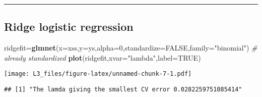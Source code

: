 \documentclass[
]{article}
\newenvironment{Shaded}{\begin{snugshade}}{\end{snugshade}}
\newcommand{\CommentTok}[1]{\textcolor[rgb]{0.56,0.35,0.01}{\textit{#1}}}
\newcommand{\DataTypeTok}[1]{\textcolor[rgb]{0.13,0.29,0.53}{#1}}
\newcommand{\DecValTok}[1]{\textcolor[rgb]{0.00,0.00,0.81}{#1}}
\newcommand{\FloatTok}[1]{\textcolor[rgb]{0.00,0.00,0.81}{#1}}
\newcommand{\KeywordTok}[1]{\textcolor[rgb]{0.13,0.29,0.53}{\textbf{#1}}}
\newcommand{\NormalTok}[1]{#1}
\newcommand{\OperatorTok}[1]{\textcolor[rgb]{0.81,0.36,0.00}{\textbf{#1}}}
\newcommand{\OtherTok}[1]{\textcolor[rgb]{0.56,0.35,0.01}{#1}}
\newcommand{\StringTok}[1]{\textcolor[rgb]{0.31,0.60,0.02}{#1}}
\begin{document}
\begin{center}\rule{0.5\linewidth}{0.5pt}\end{center}

\hypertarget{ridge-logistic-regression}{%
\subsection{Ridge logistic regression}\label{ridge-logistic-regression}}

\begin{Shaded}
\begin{Highlighting}[]
\NormalTok{ridgefit=}\KeywordTok{glmnet}\NormalTok{(}\DataTypeTok{x=}\NormalTok{xss,}\DataTypeTok{y=}\NormalTok{ys,}\DataTypeTok{alpha=}\DecValTok{0}\NormalTok{,}\DataTypeTok{standardize=}\OtherTok{FALSE}\NormalTok{,}\DataTypeTok{family=}\StringTok{"binomial"}\NormalTok{) }\CommentTok{# already standardized}
\KeywordTok{plot}\NormalTok{(ridgefit,}\DataTypeTok{xvar=}\StringTok{"lambda"}\NormalTok{,}\DataTypeTok{label=}\OtherTok{TRUE}\NormalTok{)}
\end{Highlighting}
\end{Shaded}

\texttt{[image: L3\_files/figure-latex/unnamed-chunk-7-1.pdf]}

\begin{Shaded}
\end{Shaded}

\begin{verbatim}
## [1] "The lamda giving the smallest CV error 0.0282259751085414"
\end{verbatim}

\begin{Shaded}
\end{Shaded}
\end{document}
